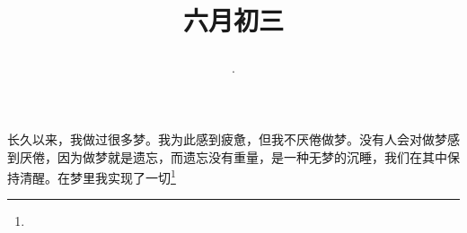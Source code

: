 \title{\date[d=8,m=7,y=2024][year:cn-y,年,month:cn,day:cn,日,·,weekday]·六月初三 }
长久以来，我做过很多梦。我为此感到疲惫，但我不厌倦做梦。没有人会对做梦感到厌倦，因为做梦就是遗忘，而遗忘没有重量，是一种无梦的沉睡，我们在其中保持清醒。在梦里我实现了一切\footnote{ }

